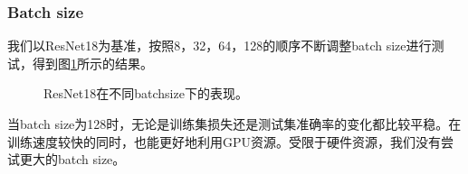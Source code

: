 \documentclass[hyperref, UTF8, 12pt]{article}
\theoremstyle{definition}
\begin{document}
\subsubsection{Batch size}
我们以ResNet18为基准，按照8，32，64，128的顺序不断调整batch size进行测试，得到图\ref{fig:resnet18_batchsize}所示的结果。
\begin{figure}[H]
	\centering
	\caption{ResNet18在不同batchsize下的表现。}
	\label{fig:resnet18_batchsize}
\end{figure}
当batch size为128时，无论是训练集损失还是测试集准确率的变化都比较平稳。在训练速度较快的同时，也能更好地利用GPU资源。受限于硬件资源，我们没有尝试更大的batch size。
\end{document}
